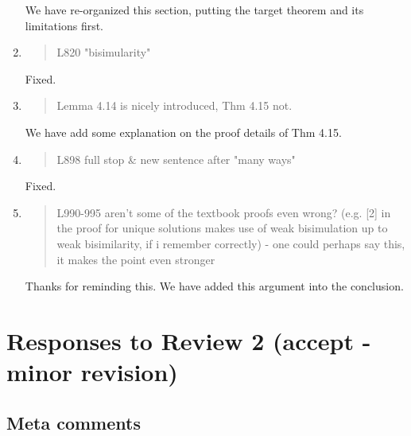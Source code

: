\begin{enumerate}
  \Mark
  We have re-organized this section, putting the target theorem and
  its limitations  first.
  
\item \begin{quote}
    L820 "bisimularity"
  \end{quote}
  \Mark
  Fixed.
  
\item \begin{quote}
    Lemma 4.14 is nicely introduced, Thm 4.15 not. 
  \end{quote}

  \Mark
  We have add some explanation on the proof details of Thm 4.15.
  
\item \begin{quote}
    L898 full stop \& new sentence after "many ways"
  \end{quote}
  \Mark
  Fixed.
  
\item \begin{quote}
    L990-995 aren't some of the textbook proofs even wrong? (e.g. [2]
    in the proof for unique solutions makes use of weak bisimulation
    up to weak bisimilarity, if i remember correctly) - one could
    perhaps say this, it makes the point even stronger
  \end{quote}

  \Mark
  Thanks for reminding this. We have added this argument into the conclusion.
  
\end{enumerate}

\section*{Responses to Review 2 (accept - minor revision)}

\subsection*{Meta comments}

